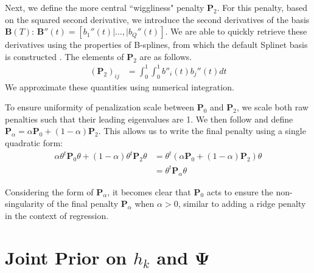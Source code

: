 \documentclass[12pt]{article}
\begin{document}
Next, we define the more central ``wiggliness" penalty $\mathbf{P}_2$. For this penalty, based on the squared second derivative, we introduce the second derivatives of the basis $\mathbf{B}(T)$: $\mathbf{B}''(t) = [b_1''(t)|\ldots,|b_Q''(t)]$. We are able to quickly retrieve these derivatives using the properties of B-splines, from which the default Splinet basis is constructed \citep{liu_splinets_2020}. The elements of $\mathbf{P}_2$ are as follows.
\begin{align*}
    (\mathbf{P}_2)_{ij} & = \int_0^1 \int_0^1 b''_i(t) b_j''(t) dt
\end{align*}
We approximate these quantities using numerical integration.

To ensure uniformity of penalization scale between $\mathbf{P}_0$ and $\mathbf{P}_2$, we scale both raw penalties such that their leading eigenvalues are 1. We then follow \cite{goldsmith_generalized_2015} and define $\mathbf{P}_{\alpha} = \alpha \mathbf{P}_0 + (1-\alpha) \mathbf{P}_2$. This allows us to write the final penalty using a single quadratic form: 
\begin{align*}
    \alpha \theta^t \mathbf{P}_0 \theta + (1- \alpha) \theta^t \mathbf{P}_2 \theta &  = \theta^t(\alpha \mathbf{P}_0 + (1-\alpha) \mathbf{P}_2) \theta\\
    & = \theta^t\mathbf{P}_{\alpha}\theta
\end{align*}

Considering the form of $\mathbf{P}_\alpha$, it becomes clear that $\mathbf{P}_0$ acts to ensure the non-singularity of the final penalty $\mathbf{P}_{\alpha}$ when $\alpha > 0$, similar to adding a ridge penalty in the context of regression.

\section{Joint Prior on $h_k$ and $\boldsymbol{\Psi}$}\label{supp:Prior_Proper}
\end{document}
